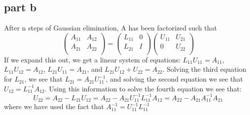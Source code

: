 \documentclass[a4paper,12pt]{article}
\begin{document}
\subsection{part b}
After n steps of Gaussian elimination, A has been factorized such that
\begin{equation}
\begin{pmatrix}
A_{11}&A_{12}\\
A_{21}&A_{22}\\
\end{pmatrix}=
\begin{pmatrix}
L_{11}&0\\
L_{21}&I\\
\end{pmatrix}
\begin{pmatrix}
U_{11}&U_{21}\\
0&U_{22}\\
\end{pmatrix}
\end{equation}
If we expand this out, we get a linear system of equations: $L_{11}U_{11}=A_{11}$, $L_{11}U_{12}=A_{12}$, $L_{21}U_{11}=A_{21}$, and $L_{21}U_{12} + U_{22}=A_{22}$. Solving the third equation for $L_{21}$, we see that $L_{21}=A_{21}U_{11}^{-1}$, and solving the second equation we see that $U_{12}=L_{11}^{-1}A_{12}$. Using this information to solve the fourth equation we see that:
\begin{equation}
U_{22}=A_{22}-L_{21}U_{12}=A_{22}-A_{21}U_{11}^{-1}L_{11}^{-1}A_{12}=A_{22}-A_{21}A_{11}^{-1}A_{21}
\end{equation} where we have used the fact that $A_{11}^{-1}=U_{11}^{-1}L_{11}^{-1}$
\end{document}
